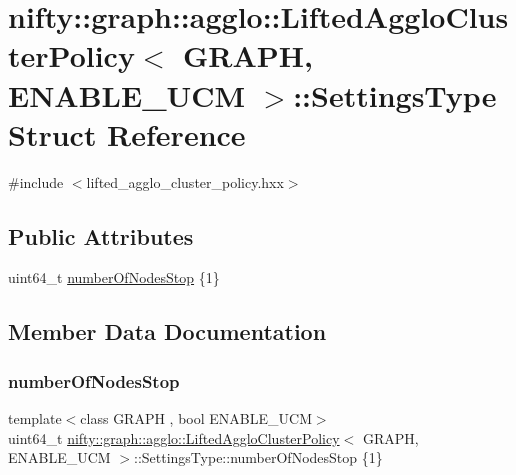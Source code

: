 \hypertarget{structnifty_1_1graph_1_1agglo_1_1LiftedAggloClusterPolicy_1_1SettingsType}{}\section{nifty\+:\+:graph\+:\+:agglo\+:\+:Lifted\+Agglo\+Cluster\+Policy$<$ G\+R\+A\+PH, E\+N\+A\+B\+L\+E\+\_\+\+U\+CM $>$\+:\+:Settings\+Type Struct Reference}
\label{structnifty_1_1graph_1_1agglo_1_1LiftedAggloClusterPolicy_1_1SettingsType}


{\ttfamily \#include $<$lifted\+\_\+agglo\+\_\+cluster\+\_\+policy.\+hxx$>$}

\subsection*{Public Attributes}
\begin{DoxyCompactItemize}
\item 
uint64\+\_\+t \hyperlink{structnifty_1_1graph_1_1agglo_1_1LiftedAggloClusterPolicy_1_1SettingsType_a1722c7a56476212d118d054184f36244}{number\+Of\+Nodes\+Stop} \{1\}
\end{DoxyCompactItemize}


\subsection{Member Data Documentation}
\mbox{\label{structnifty_1_1graph_1_1agglo_1_1LiftedAggloClusterPolicy_1_1SettingsType_a1722c7a56476212d118d054184f36244}} 
\subsubsection{\texorpdfstring{number\+Of\+Nodes\+Stop}{numberOfNodesStop}}
{\footnotesize\ttfamily template$<$class G\+R\+A\+PH , bool E\+N\+A\+B\+L\+E\+\_\+\+U\+CM$>$ \\
uint64\+\_\+t \hyperlink{classnifty_1_1graph_1_1agglo_1_1LiftedAggloClusterPolicy}{nifty\+::graph\+::agglo\+::\+Lifted\+Agglo\+Cluster\+Policy}$<$ G\+R\+A\+PH, E\+N\+A\+B\+L\+E\+\_\+\+U\+CM $>$\+::Settings\+Type\+::number\+Of\+Nodes\+Stop \{1\}}



